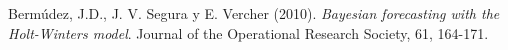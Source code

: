  Berm\'udez, J.D., J. V. Segura y E. Vercher (2010). \emph{Bayesian forecasting with the Holt-Winters model}. Journal of the Operational Research Society, 61, 164-171.
